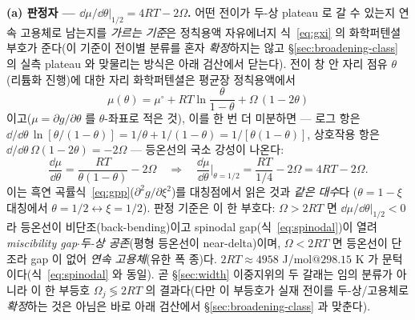 \textbf{(a) 판정자 --- $\dd\mu/\dd\theta|_{1/2}=4RT-2\Omega$.} 어떤 전이가 두-상 plateau 로 갈 수 있는지 연속
고용체로 남는지를 \emph{가르는 기준}은 정칙용액 자유에너지 식~\eqref{eq:gxi} 의 화학퍼텐셜 부호가 준다(이 기준이
전이별 분류를 혼자 \emph{확정}하지는 않고 \S\ref{sec:broadening-class} 의 실측 plateau 와 맞물리는 방식은 아래
검산에서 닫는다). 전이 창 안 자리 점유 $\theta$(리튬화 진행)에
대한 자리 화학퍼텐셜은 평균장 정칙용액에서
\begin{equation}
\mu(\theta)=\mu^\circ+RT\ln\frac{\theta}{1-\theta}+\Omega\,(1-2\theta)
\label{eq:gr2l-mu}
\end{equation}
이고($\mu=\partial g/\partial\theta$ 를 $\theta$-좌표로 적은 것), 이를 한 번 더 미분하면 --- 로그 항은
$\dd/\dd\theta\,\ln[\theta/(1-\theta)]=1/\theta+1/(1-\theta)=1/[\theta(1-\theta)]$, 상호작용 항은
$\dd/\dd\theta\,\Omega(1-2\theta)=-2\Omega$ --- 등온선의 국소 강성이 나온다:
\begin{equation}
\frac{\dd\mu}{\dd\theta}=\frac{RT}{\theta(1-\theta)}-2\Omega
\quad\Longrightarrow\quad
\frac{\dd\mu}{\dd\theta}\Big|_{\theta=1/2}=\frac{RT}{1/4}-2\Omega=4RT-2\Omega.
\label{eq:gr2l-disc}
\end{equation}
이는 흑연 곡률식~\eqref{eq:gpp}($\partial^2 g/\partial\xi^2$)를 대칭점에서 읽은 것과 \emph{같은 대수}다
($\theta{=}1{-}\xi$ 대칭에서 $\theta{=}1/2\leftrightarrow\xi{=}1/2$). 판정 기준은 이 한 부호다: $\Omega>2RT$ 면
$\dd\mu/\dd\theta|_{1/2}<0$ 라 등온선이 비단조(back-bending)이고 spinodal gap(식~\eqref{eq:spinodal})이 열려
\emph{miscibility gap$\cdot$두-상 공존}(평형 등온선이 near-delta)이며, $\Omega<2RT$ 면 등온선이 단조라 gap 이 없어
\emph{연속 고용체}(유한 폭 종)다. $2RT\approx4958$ J/mol$@298.15$ K 가 문턱이다(식~\eqref{eq:spinodal} 와 동일).
곧 \S\ref{sec:width} 이중지위의 두 갈래는 임의 분류가 아니라 이 한 부등호 $\Omega_j\lessgtr2RT$ 의 결과다(다만 이
부등호가 실재 전이를 두-상/고용체로 \emph{확정}하는 것은 아님은 바로 아래 검산에서 \S\ref{sec:broadening-class}
과 맞춘다).

